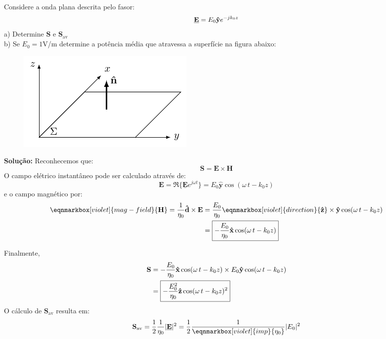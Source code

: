 \begin{question}
    Considere a onda plana descrita pelo fasor:
    $$
        \mathbf{\underline{E}} = E_0 \mathbf{\Hat{y}}e^{-jk_0z}
    $$
    a) Determine $\mathbf{S}$ e $\mathbf{S}_\text{av}$\\[3pt]
    b) Se $E_0 = 1$V/m determine a potência média que atravessa a superfície na figura abaixo:
    \begin{figure}[H]
        \centering
        \includegraphics[width=0.3\linewidth]{img/1/Plane.pdf}
    \end{figure}

    \vspace{-1em}
    \questionSep
    \textbf{Solução:} Reconhecemos que:
    $$
        \mathbf{S} = \mathbf{E}\times\mathbf{H}
    $$
    O campo elétrico instantâneo pode ser calculado através de:
    $$
        \mathbf{E} = \Re\{\mathbf{\underline{E}} e^{j\omega t}\} = E_0\mathbf{\hat{y}}\cos(\omega\,t - k_0 z)
    $$
    e o campo magnético por:
    $$
        \begin{aligned}
             \eqnmarkbox[violet]{mag-field}{\mathbf{H}} = \frac{1}{\eta_0} \mathbf{\Hat{d}}\times \mathbf{E}
            &= \frac{E_0}{\eta_0} \eqnmarkbox[violet]{direction}{\mathbf{\Hat{z}}}\times\mathbf{\Hat{y}}\cos(\omega\,t - k_0 z)\\
            &= \boxed{-\frac{E_0}{\eta_0} \mathbf{\Hat{x}}\cos(\omega\,t - k_0 z)}
        \end{aligned}
    $$
    
    Finalmente,
    $$
        \begin{aligned}
            \mathbf{S} &= -\frac{E_0}{\eta_0} \mathbf{\Hat{x}}\cos(\omega\,t - k_0 z)\times E_0\mathbf{\hat{y}}\cos(\omega\,t - k_0 z)\\
            &= \boxed{-\frac{E_0^2}{\eta_0} \mathbf{\Hat{z}}\cos(\omega\,t - k_0 z)^2}
        \end{aligned}
    $$
    O cálculo de $\mathbf{S}_{\text{av}}$ resulta em:
    $$
        \mathbf{S}_{\text{av}} = \frac{1}{2} \frac{1}{\eta_0}| \mathbf{\underline{E}}|^2
        = \frac{1}{2} \frac{1}{ \eqnmarkbox[violet]{imp}{\eta_0}}|E_0|^2
    $$


\end{question}
